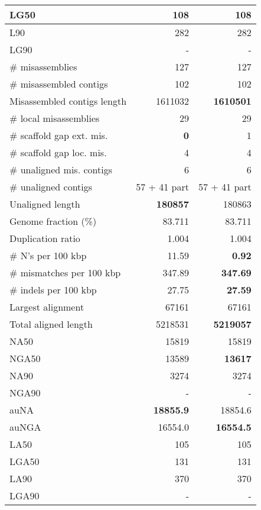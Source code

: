 \documentclass[12pt,a4paper]{article}
\begin{document}
\begin{table}[ht]
\begin{center}
\begin{tabular}{|l*{2}{|r}|}
LG50 & 108 & 108 \\ \hline
L90 & 282 & 282 \\ \hline
LG90 & - & - \\ \hline
\# misassemblies & 127 & 127 \\ \hline
\# misassembled contigs & 102 & 102 \\ \hline
Misassembled contigs length & 1611032 & {\bf 1610501} \\ \hline
\# local misassemblies & 29 & 29 \\ \hline
\# scaffold gap ext. mis. & {\bf 0} & 1 \\ \hline
\# scaffold gap loc. mis. & 4 & 4 \\ \hline
\# unaligned mis. contigs & 6 & 6 \\ \hline
\# unaligned contigs & 57 + 41 part & 57 + 41 part \\ \hline
Unaligned length & {\bf 180857} & 180863 \\ \hline
Genome fraction (\%) & 83.711 & 83.711 \\ \hline
Duplication ratio & 1.004 & 1.004 \\ \hline
\# N's per 100 kbp & 11.59 & {\bf 0.92} \\ \hline
\# mismatches per 100 kbp & 347.89 & {\bf 347.69} \\ \hline
\# indels per 100 kbp & 27.75 & {\bf 27.59} \\ \hline
Largest alignment & 67161 & 67161 \\ \hline
Total aligned length & 5218531 & {\bf 5219057} \\ \hline
NA50 & 15819 & 15819 \\ \hline
NGA50 & 13589 & {\bf 13617} \\ \hline
NA90 & 3274 & 3274 \\ \hline
NGA90 & - & - \\ \hline
auNA & {\bf 18855.9} & 18854.6 \\ \hline
auNGA & 16554.0 & {\bf 16554.5} \\ \hline
LA50 & 105 & 105 \\ \hline
LGA50 & 131 & 131 \\ \hline
LA90 & 370 & 370 \\ \hline
LGA90 & - & - \\ \hline
\end{tabular}
\end{center}
\end{table}
\end{document}
